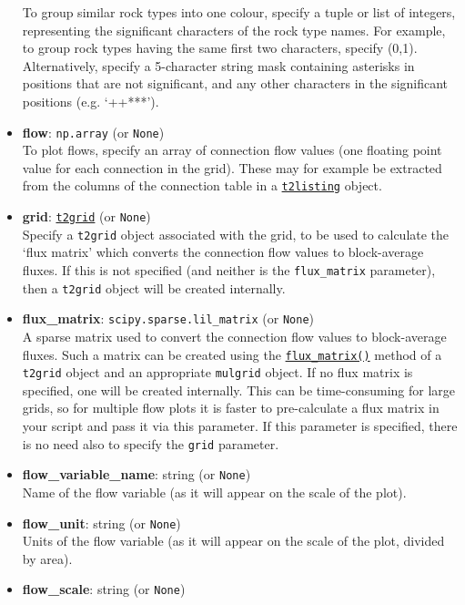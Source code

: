 \begin{itemize}
  To group similar rock types into one colour, specify a tuple or list of integers, representing the significant characters of the rock type names.  For example, to group rock types having the same first two characters, specify (0,1).  Alternatively, specify a 5-character string mask containing asterisks in positions that are not significant, and any other characters in the significant positions (e.g. `++***').
\item \textbf{flow}: \texttt{np.array} (or \texttt{None})\\
  To plot flows, specify an array of connection flow values (one floating point value for each connection in the grid).  These may for example be extracted from the columns of the connection table in a \hyperref[listingfiles]{\texttt{t2listing}} object.
\item \textbf{grid}: \hyperref[t2grids]{\texttt{t2grid}} (or \texttt{None})\\
  Specify a \texttt{t2grid} object associated with the grid, to be used to calculate the `flux matrix' which converts the connection flow values to block-average fluxes.  If this is not specified (and neither is the \texttt{flux\_matrix} parameter), then a \texttt{t2grid} object will be created internally.
\item \textbf{flux\_matrix}: \texttt{scipy.sparse.lil\_matrix} (or \texttt{None})\\
  A sparse matrix used to convert the connection flow values to block-average fluxes.  Such a matrix can be created using the \hyperref[sec:t2grid:flux_matrix]{\texttt{flux\_matrix()}} method of a \texttt{t2grid} object and an appropriate \texttt{mulgrid} object.  If no flux matrix is specified, one will be created internally.  This can be time-consuming for large grids, so for multiple flow plots it is faster to pre-calculate a flux matrix in your script and pass it via this parameter.  If this parameter is specified, there is no need also to specify the \texttt{grid} parameter.
\item \textbf{flow\_variable\_name}: string (or \texttt{None})\\
  Name of the flow variable (as it will appear on the scale of the plot).
\item \textbf{flow\_unit}: string (or \texttt{None})\\
  Units of the flow variable (as it will appear on the scale of the plot, divided by area).
\item \textbf{flow\_scale}: string (or \texttt{None})\\

\end{itemize}
